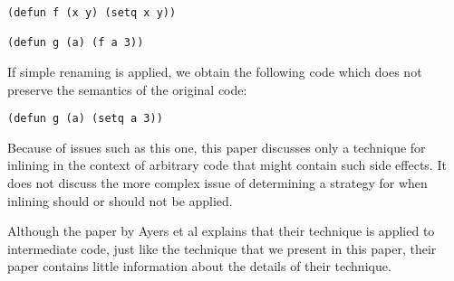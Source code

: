 \begin{verbatim}
(defun f (x y) (setq x y))

(defun g (a) (f a 3))
\end{verbatim}

If simple renaming is applied, we obtain the following code which does
not preserve the semantics of the original code:

\begin{verbatim}
(defun g (a) (setq a 3))
\end{verbatim}

\noindent
Because of issues such as this one, this paper discusses only a
technique for inlining in the context of arbitrary \commonlisp{} code
that might contain such side effects.  It does not discuss the more
complex issue of determining a strategy for when inlining should or
should not be applied.

Although the paper by Ayers et al explains that their technique is
applied to intermediate code, just like the technique that we present
in this paper, their paper contains little information about the details
of their technique.

